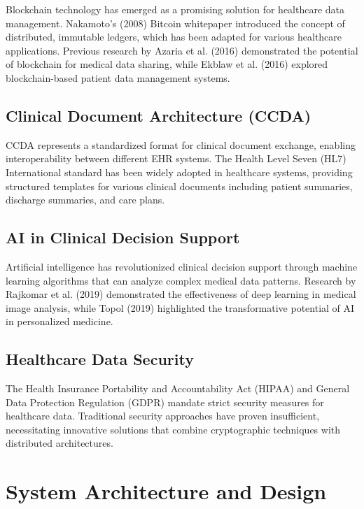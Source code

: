 \documentclass[12pt,a4paper]{article}
\begin{document}
Blockchain technology has emerged as a promising solution for healthcare data management. Nakamoto's (2008) Bitcoin whitepaper introduced the concept of distributed, immutable ledgers, which has been adapted for various healthcare applications. Previous research by Azaria et al. (2016) demonstrated the potential of blockchain for medical data sharing, while Ekblaw et al. (2016) explored blockchain-based patient data management systems.

\subsection{Clinical Document Architecture (CCDA)}

CCDA represents a standardized format for clinical document exchange, enabling interoperability between different EHR systems. The Health Level Seven (HL7) International standard has been widely adopted in healthcare systems, providing structured templates for various clinical documents including patient summaries, discharge summaries, and care plans.

\subsection{AI in Clinical Decision Support}

Artificial intelligence has revolutionized clinical decision support through machine learning algorithms that can analyze complex medical data patterns. Research by Rajkomar et al. (2019) demonstrated the effectiveness of deep learning in medical image analysis, while Topol (2019) highlighted the transformative potential of AI in personalized medicine.

\subsection{Healthcare Data Security}

The Health Insurance Portability and Accountability Act (HIPAA) and General Data Protection Regulation (GDPR) mandate strict security measures for healthcare data. Traditional security approaches have proven insufficient, necessitating innovative solutions that combine cryptographic techniques with distributed architectures.

\section{System Architecture and Design}
\end{document}
